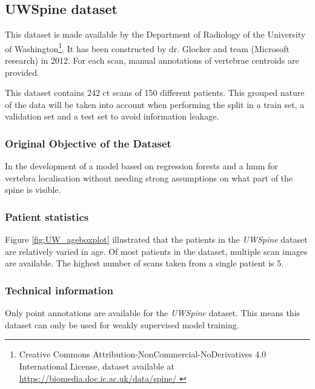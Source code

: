 \subsection{UWSpine dataset}
 
This dataset is made available by the Department of Radiology of the University of Washington\footnote{Creative Commons Attribution-NonCommercial-NoDerivatives 4.0 International License, dataset available at \url{
      https://biomedia.doc.ic.ac.uk/data/spine/  
    }}.
It has been constructed by dr. Glocker and team \cite{Glocker2012,Glocker2013} (Microsoft research) in 2012.
For each scan, manual annotations of vertebrae centroids are provided.

This dataset contains 242 \acrshort{ct} scans of 150 different patients.
This grouped nature of the data will be taken into account when performing the split in a train set, a validation set and a test set to avoid information leakage.

\subsubsection{Original Objective of the Dataset}

In \cite{Glocker2012,Glocker2013} the development of a model based on regression forests and a \acrfull{hmm} for vertebra localisation without needing strong assumptions on what part of the spine is visible.

\subsubsection{Patient statistics}

Figure \ref{fig:UW_ageboxplot} illustrated that the patients in the \textit{UWSpine} dataset are relatively varied in age.
Of most patients in the dataset, multiple scan images are available.
The highest number of scans taken from a single patient is 5.

\subsubsection{Technical information}

Only point annotations are available for the \textit{UWSpine} dataset. 
This means this dataset can only be used for weakly supervised model training.

